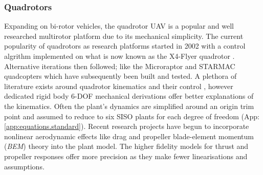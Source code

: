 \subsubsection*{Quadrotors}
Expanding on bi-rotor vehicles, the quadrotor UAV is a popular and well researched multirotor platform due to its mechanical simplicity. The current popularity of quadrotors as research platforms started in 2002 with a control algrithm implemented on what is now known as the X4-Flyer quadrotor \cite{x4flyer,x4flyercontrol}. Alternative iterations then followed; like the Microraptor\cite{microraptor} and STARMAC\cite{starmac} quadcopters which have subsequently been built and tested. A plethora of literature exists around quadrotor kinematics and their control \cite{dynamicmodelling2013, quaddynamics, fullquadcoptercontrol}, however dedicated rigid body 6-DOF mechanical derivations \cite{rigidbodylecture,eulerrigidbody} offer better explanations of the kinematics. Often the plant's dynamics are simplified around an origin trim point and assumed to reduce to six SISO plants for each degree of freedom (App:\ref{app:equations.standard}). Recent research projects have begun to incorporate nonlinear aerodynamic effects like drag and propeller blade-element momentum (\emph{BEM}) theory into the plant model\cite{lowreynolds,bem,starmac,nonlineardynamics}. The higher fidelity models for thrust and propeller responses offer more precision as they make fewer linearisations and assumptions.
\par
